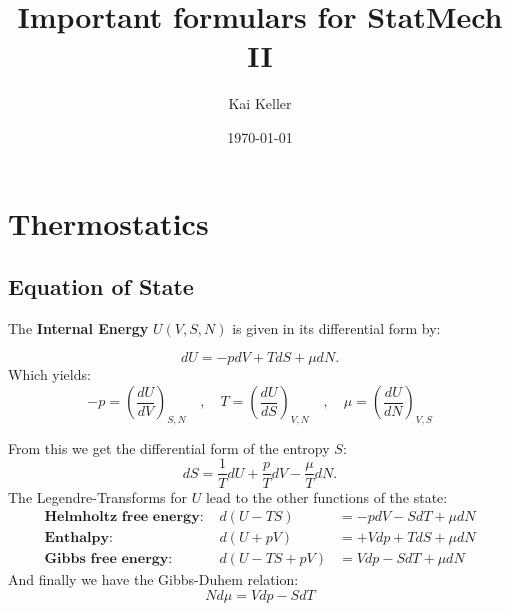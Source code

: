 \documentclass[a4paper]{article}
\title{Important formulars for StatMech II}
\author{Kai Keller}
\date{\today}
\begin{document}
\maketitle
\tableofcontents

\newpage

\section{Thermostatics}

\subsection{Equation of State}
The \textbf{Internal Energy} $U(V,S,N)$ is given in  its differential form by:

\begin{equation}
dU=-pdV+TdS+\mu dN.
\end{equation}
Which yields:
\begin{equation}
-p=\left( \frac{dU}{dV} \right)_{S,N}\quad,\quad T=\left( \frac{dU}{dS} \right)_{V,N}\quad,\quad \mu=\left( \frac{dU}{dN} \right)_{V,S}
\end{equation}

From this we get the differential form of the entropy $S$:
\begin{equation}
dS=\frac{1}{T}dU+\frac{p}{T}dV-\frac{\mu}{T}dN.
\end{equation}
The Legendre-Transforms for $U$ lead to the other functions of the state:
\begin{align}
\textbf{Helmholtz free energy: } & d(U-TS) &= -pdV-SdT+\mu dN \\
\textbf{Enthalpy: } & d(U+pV) &= +Vdp+TdS+\mu dN \\
\textbf{Gibbs free energy: } & d(U-TS+pV) &= Vdp-SdT+\mu dN
\end{align} 
And finally we have the Gibbs-Duhem relation:
\begin{equation}
Nd\mu=Vdp-SdT
\end{equation}
\end{document}
